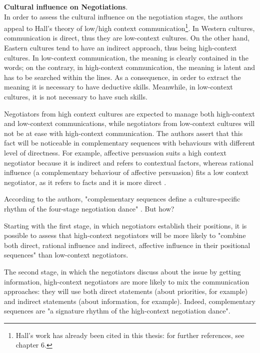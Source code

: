 \documentclass[../main.tex]{subfiles}
\begin{document}
\textbf{Cultural influence on Negotiations}.\\
In order to assess the cultural influence on the negotiation stages, the authors appeal to Hall's theory of low/high context communication\footnote{Hall's work has already been cited in this thesis: for further references, see chapter 6.}.
In Western cultures, communication is direct, thus they are low-context cultures. On the other hand, Eastern cultures tend to have an indirect approach, thus being high-context cultures. In low-context communication, the meaning is clearly contained in the words; on the contrary, in high-context communication, the meaning is latent and has to be searched within the lines. As a consequence, in order to extract the meaning it is necessary to have deductive skills. Meanwhile, in low-context cultures, it is not necessary to have such skills.

Negotiators from high context cultures are expected to manage both high-context and low-context communications, while negotiators from low-context cultures will not be at ease with high-context communication. The authors assert that this fact will be noticeable in complementary sequences with behaviours with different level of directness. For example, affective persuasion suits a high context negotiator because it is indirect and refers to contextual factors, whereas rational influence (a complementary behaviour of affective persuasion) fits a low context negotiator, as it refers to facts and it is more direct \mancite\autocite[38]{adair}.

According to the authors, "complementary sequences define a culture-specific rhythm of the four-stage negotiation dance" \mancite\autocite[38]{adair}. But how?

Starting with the first stage, in which negotiators establish their positions, it is possible to assess that high-context negotiators will be more likely to "combine both direct, rational influence and indirect, affective influence in their positional sequences" \mancite\autocite[38]{adair} than low-context negotiators.

The second stage, in which the negotiators discuss about the issue by getting information, high-context negotiators are more likely to mix the communication approaches: they will use both direct statements (about priorities, for example) and indirect statements (about information, for example). Indeed, complementary sequences are "a signature rhythm of the high-context negotiation dance"\mancite\autocite[38]{adair}.
\end{document}
